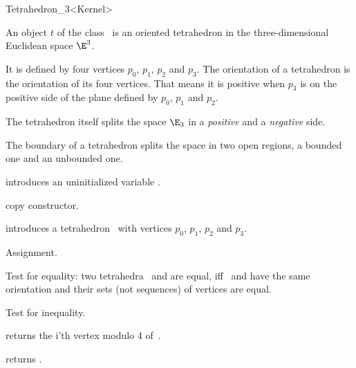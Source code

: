 \begin{ccRefClass} {Tetrahedron_3<Kernel>}

\ccDefinition  An object $t$ of the class \ccRefName\ is an oriented
tetrahedron in the three-dimensional Euclidean space $\E^3$. 

It is defined by four vertices $p_0$, $p_1$, $p_2$ and $p_3$.
The orientation of a tetrahedron is the orientation of its four 
vertices. That means it is positive when $p_3$ is on the positive
side of the plane defined by $p_0$, $p_1$ and $p_2$.

The tetrahedron itself splits the space $\E_3$ in a {\em positive} and
a {\em negative} side.
 
The boundary of a tetrahedron splits the space in two open regions, a
bounded one and an unbounded one.

\ccCreation
{}


\ccHidden {}
             {introduces an uninitialized variable \ccVar.}

\ccHidden {}
 	    {copy constructor.}


            {introduces a tetrahedron \ccVar\ with vertices $p_0$, $p_1$, $p_2$ and $p_3$.}


\ccOperations

\ccHidden {}
        {Assignment.}

       {Test for equality: two tetrahedra \ccVar\ and  are equal, 
        iff \ccVar\ and  have the same orientation and 
        their sets (not sequences) of vertices are equal.}

       {Test for inequality.}

       {returns the i'th vertex modulo 4  of~\ccVar.}

       {returns .}


\end{ccRefClass}
